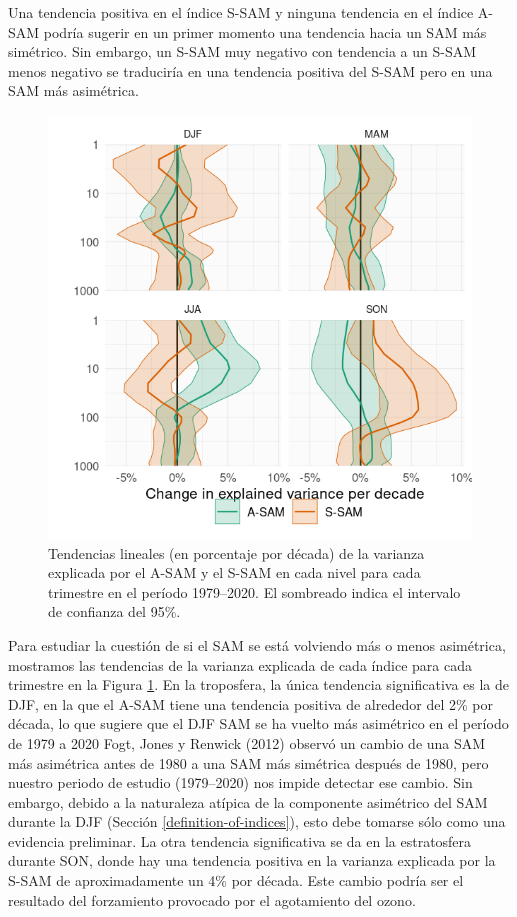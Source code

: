 \documentclass[12pt,oneside,a4paper]{reedthesis}
\begin{document}
Una tendencia positiva en el índice S-SAM y ninguna tendencia en el índice A-SAM podría sugerir en un primer momento una tendencia hacia un SAM más simétrico.
Sin embargo, un S-SAM muy negativo con tendencia a un S-SAM menos negativo se traduciría en una tendencia positiva del S-SAM pero en una SAM más asimétrica.



\begin{figure}

{\centering \includegraphics{figures/30-sam/r-squared-trend-1} 

}

\caption{Tendencias lineales (en porcentaje por década) de la varianza explicada por el A-SAM y el S-SAM en cada nivel para cada trimestre en el período 1979--2020. El sombreado indica el intervalo de confianza del 95\%.}\label{fig:r-squared-trend}
\end{figure}

Para estudiar la cuestión de si el SAM se está volviendo más o menos asimétrica, mostramos las tendencias de la varianza explicada de cada índice para cada trimestre en la Figura \ref{fig:r-squared-trend}.
En la troposfera, la única tendencia significativa es la de DJF, en la que el A-SAM tiene una tendencia positiva de alrededor del 2\% por década, lo que sugiere que el DJF SAM se ha vuelto más asimétrico en el período de 1979 a 2020 Fogt, Jones y Renwick (2012) observó un cambio de una SAM más asimétrica antes de 1980 a una SAM más simétrica después de 1980, pero nuestro periodo de estudio (1979--2020) nos impide detectar ese cambio.
Sin embargo, debido a la naturaleza atípica de la componente asimétrico del SAM durante la DJF (Sección \ref{definition-of-indices}), esto debe tomarse sólo como una evidencia preliminar.
La otra tendencia significativa se da en la estratosfera durante SON, donde hay una tendencia positiva en la varianza explicada por la S-SAM de aproximadamente un 4\% por década.
Este cambio podría ser el resultado del forzamiento provocado por el agotamiento del ozono.
\end{document}
